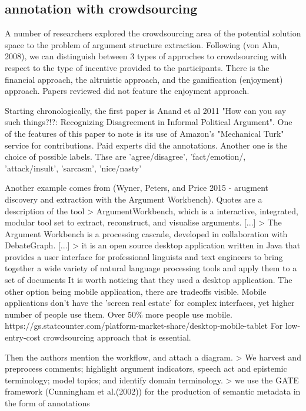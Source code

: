 \documentclass{article}
\begin{document}
\subsection{annotation with crowdsourcing}
A number of researchers explored the crowdsourcing area of the potential solution space to the problem of argument structure extraction.
Following (von Ahn, 2008), we can distinguish between 3 types of approches to crowdsourcing with respect to the type of incentive provided to the participants.
There is the financial approach, the altruistic approach, and the gamification (enjoyment) approach. Papers reviewed did not feature the enjoyment approach.

Starting chronologically, the first paper is Anand et al 2011 "How can you say such things?!?: Recognizing Disagreement in Informal Political Argument".
One of the features of this paper to note is its use of Amazon's "Mechanical Turk" service for contributions. Paid experts did the annotations.
Another one is the choice of possible labels. Thse are 'agree/disagree', 'fact/emotion/, 'attack/insult', 'sarcasm', 'nice/nasty'

Another example comes from (Wyner, Peters, and Price 2015 - arugment discovery and extraction with the Argument Workbench).
Quotes are a description of the tool
> ArgumentWorkbench, which is a interactive, integrated, modular tool set to extract, reconstruct, and visualise arguments. [...]
> The Argument Workbench is a processing cascade, developed in collaboration with DebateGraph. [...]
> it is an open source desktop application written in Java that provides a user interface for professional linguists and text engineers to bring together a wide variety of natural language processing tools and apply them to a set of documents
It is worth noticing that they used a desktop application. The other option being mobile application, there are tradeoffs visible.
Mobile applications don't have the 'screen real estate' for complex interfaces, yet higher number of people use them. Over 50\% more people use mobile.
https://gs.statcounter.com/platform-market-share/desktop-mobile-tablet
For low-entry-cost crowdsourcing approach that is essential.

Then the authors mention the workflow, and attach a diagram.
> We harvest and preprocess comments; highlight argument indicators, speech act and epistemic terminology; model topics; and identify domain terminology.
> we use the GATE framework (Cunningham et al.(2002)) for the production of semantic metadata in the form of annotations
\end{document}
